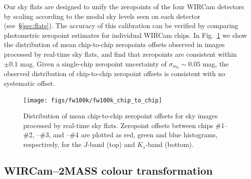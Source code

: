 \documentclass[iop]{emulateapj}
\newcommand{\comment}[1]{\textcolor{purple}{#1}} %
\newcommand{\Fig}[1]{Fig.~\ref{fig:#1}}  %
\newcommand{\Sec}[1]{\S\ref{sec:#1}}  %
\begin{document}
Our sky flats are designed to unify the zeropoints of the four WIRCam detectors by scaling according to the modal sky levels seen on each detector (see~\Sec{flats}).
The accuracy of this calibration can be verified by comparing photometric zeropoint estimates for individual WIRCam chips.
In \Fig{fw100k_chip_to_chip} we show the distribution of mean chip-to-chip zeropoints offsets observed in images processed by real-time sky flats, and find that zeropoints are consistent within $\pm 0.1$ mag.
Given a single-chip zeropoint uncertainty of $\sigma_{m_0} \sim 0.05$ mag, the observed distribution of chip-to-chip zeropoint offsets is consistent with no systematic offset.

\begin{figure}[t]
\centering
\texttt{[image: figs/fw100k/fw100k\_chip\_to\_chip]}
\caption{Distribution of mean chip-to-chip zeropoint offsets for sky images processed by real-time sky flats. Zeropoint offsets between chips \#1--\#2, --\#3, and --\#4 are plotted as
red, green and blue histograms, respectively, for the $J$-band (top) and $K_s$-band (bottom).}
\label{fig:fw100k_chip_to_chip}
\end{figure}

\subsection{WIRCam--2MASS colour transformation}
\label{sec:color_trans}
\end{document}
